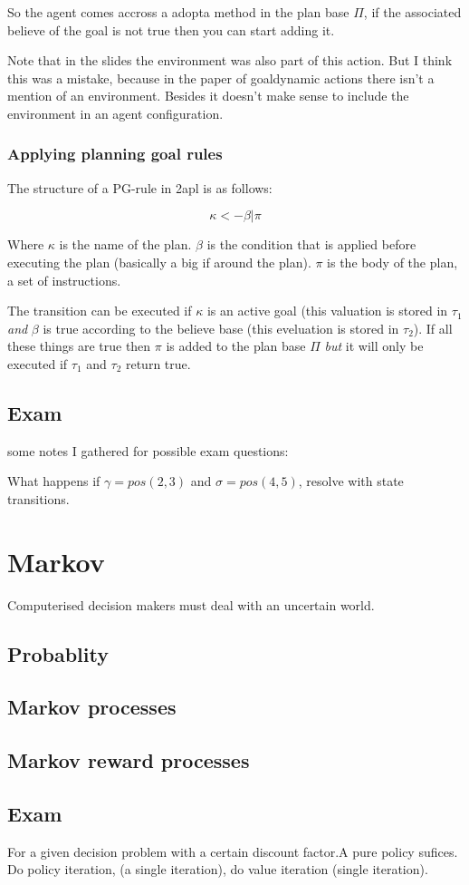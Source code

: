 \documentclass{article}
\begin{document}
So the agent comes accross a adopta method in the plan base $\Pi$, if
the associated believe of the goal is not true then you can start adding
it.

Note that in the slides the environment was also part of this action. But I
think this was a mistake, because in the paper of goaldynamic actions there
isn't a mention of an environment. Besides it doesn't make sense to include
the environment in an agent configuration.

\subsubsection{Applying planning goal rules}
The structure of a PG-rule in 2apl is as follows:

\[\kappa <- \beta | \pi \]

Where $\kappa$ is the name of the plan.
$\beta$ is the condition that is applied before
executing the plan (basically a big if around the plan). $\pi$ is
the body of the plan, a set of instructions.

\begin{prooftree}
\end{prooftree}

The transition can be executed if $\kappa$ is an active goal (this valuation
is stored in $\tau_1$ \emph{and} $\beta$ is true according to the believe 
base (this eveluation is stored in $\tau_2$). If all these things are true
then $\pi$ is added to the plan base $\Pi$ \emph{but} it will only be executed
if $\tau_1$ and $\tau_2$ return true.
\subsection{Exam}
some notes I gathered for possible exam questions:

What happens if $\gamma = pos(2,3)$ and $\sigma = pos(4,5)$, resolve with
state transitions.

\section{Markov}
Computerised decision makers must deal with an uncertain world.

\subsection{Probablity}

\subsection{Markov processes}

\subsection{Markov reward processes}

\subsection{Exam}
 For a given decision problem with a certain
discount factor.A pure policy sufices.
Do policy iteration, (a single iteration), do value iteration
(single iteration).
\end{document}
